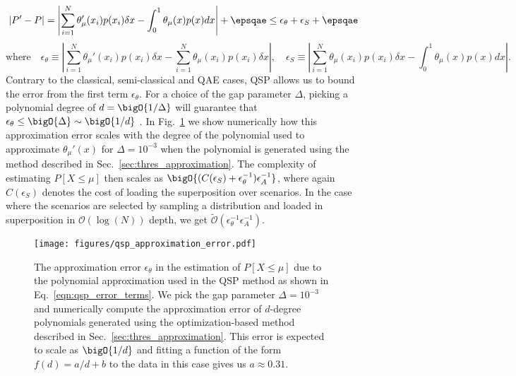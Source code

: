 \begin{enumerate}
\begin{equation}
	|P' - P| = \left| \sum_{i=1}^N \theta_{\mu}'(x_i)p(x_i)\delta x - \int_0^1 \theta_{\mu}(x)p(x)dx\right| + \epsqae \le \epsilon_{\theta} + \epsilon_S + \epsqae \nonumber
\end{equation}
\begin{equation}
	\label{eqn:qsp_error_terms}
	\textrm{where} \quad \epsilon_{\theta} \equiv \left| \sum_{i=1}^N \theta_{\mu}'(x_i)p(x_i)\delta x - \sum_{i=1}^N \theta_{\mu}(x_i)p(x_i)\delta x\right|, \quad \epsilon_S \equiv \left| \sum_{i=1}^N \theta_{\mu}(x_i)p(x_i)\delta x - \int_0^1 \theta_{\mu}(x)p(x)dx\right|.
\end{equation}
Contrary to the classical, semi-classical and QAE cases, QSP allows us to bound the error from the first term $\epsilon_{\theta}$.
For a choice of the gap parameter $\Delta$, picking a polynomial degree of $d=\bigO{1/\Delta}$ will guarantee that $\epsilon_{\theta} \le \bigO{\Delta} \sim \bigO{1/d}$ \cite{low2017hamiltonian, dong2022ground}.
In Fig.~\ref{fig:qsp_approximation_error} we show numerically how this approximation error scales with the degree of the polynomial used to approximate $\theta_{\mu}'(x)$ for $\Delta=10^{-3}$ when the polynomial is generated using the method described in Sec.~\ref{sec:thres_approximation}.
The complexity of estimating $P[X\le \mu]$ then scales as $\bigO{(C(\epsilon_S) + \epsilon_{\theta}^{-1})\epsilon_A^{-1}}$, where again $C(\epsilon_S)$ denotes the cost of loading the superposition over scenarios.
In the case where the scenarios are selected by sampling a distribution and loaded in superposition in $\mathcal{O}(\log(N))$ depth, we get $\tilde{\mathcal{O}}\left(\epsilon_{\theta}^{-1}\epsilon_A^{-1} \right)$.

\begin{figure}[t]
  \centering
  \texttt{[image: figures/qsp\_approximation\_error.pdf]}
  \caption{The approximation error $\epsilon_{\theta}$ in the estimation of $P[X \le \mu]$ due to the polynomial approximation used in the QSP \var{} method as shown in Eq.~\eqref{eqn:qsp_error_terms}. We pick the gap parameter $\Delta=10^{-3}$ and numerically compute the approximation error of $d$-degree polynomials generated using the optimization-based method described in Sec.~\ref{sec:thres_approximation}. This error is expected to scale as $\bigO{1/d}$ and fitting a function of the form $f(d) = a/d+b$ to the data in this case gives us $a \approx 0.31$.}
  \label{fig:qsp_approximation_error}
\end{figure}


\end{enumerate}
